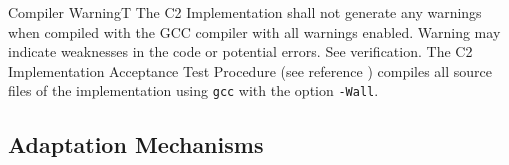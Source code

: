 \documentclass[a4paper,10pt]{article}
\newenvironment{fw_req}[6]
{\addtocounter{subsubsection}{1}
	\hspace{0.2cm}\textbf{CR-\arabic{section}.\arabic{subsection}.\arabic{subsubsection}/#2
	\hspace{0.8cm} #1}
	\vspace{-10pt}
\begin{longtable}{p{2.7cm}P{8.5cm}}
\hline
\textsc{Requirement} & #3 \\
\textsc{Justification} & #4 \\
\textsc{Implementation} & #5  \\ 
\textsc{Verification} & #6  \\
\hline
}
{\end{longtable}}
\begin{document}
\begin{fw_req}{Compiler Warning}{T}
{The C2 Implementation shall not generate any warnings when compiled with the GCC compiler with all warnings enabled.}
{Warning may indicate weaknesses in the code or potential errors.}
{See verification.} 
{The C2 Implementation Acceptance Test Procedure (see reference \cite{ref:C2Implementation}) compiles all source files of the implementation using \texttt{gcc} with the option \texttt{-Wall}.}
\end{fw_req}


\subsection{Adaptation Mechanisms}\label{req:adaptationMechanisms}
\end{document}

